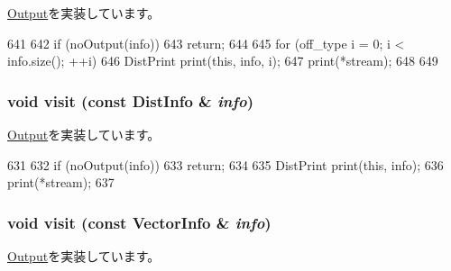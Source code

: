 \hyperlink{structStats_1_1Output_a0f589846ed888d3e44db1185b6510bbb}{Output}を実装しています。


\begin{DoxyCode}
641 {
642     if (noOutput(info))
643         return;
644 
645     for (off_type i = 0; i < info.size(); ++i) {
646         DistPrint print(this, info, i);
647         print(*stream);
648     }
649 }
\end{DoxyCode}
\hypertarget{classStats_1_1Text_a1d1b48c85e0f4ddab4cb23e57b855214}{
\subsubsection[{visit}]{\setlength{\rightskip}{0pt plus 5cm}void visit (const {\bf DistInfo} \& {\em info})}}
\label{classStats_1_1Text_a1d1b48c85e0f4ddab4cb23e57b855214}


\hyperlink{structStats_1_1Output_add4fd62195e918f438ee10305ea0e20e}{Output}を実装しています。


\begin{DoxyCode}
631 {
632     if (noOutput(info))
633         return;
634 
635     DistPrint print(this, info);
636     print(*stream);
637 }
\end{DoxyCode}
\hypertarget{classStats_1_1Text_a1cc217540e3402a1d09b3b8c040abdb3}{
\subsubsection[{visit}]{\setlength{\rightskip}{0pt plus 5cm}void visit (const {\bf VectorInfo} \& {\em info})}}
\label{classStats_1_1Text_a1cc217540e3402a1d09b3b8c040abdb3}


\hyperlink{structStats_1_1Output_a6157ee2f68b0738ae8a789d20584be4d}{Output}を実装しています。


